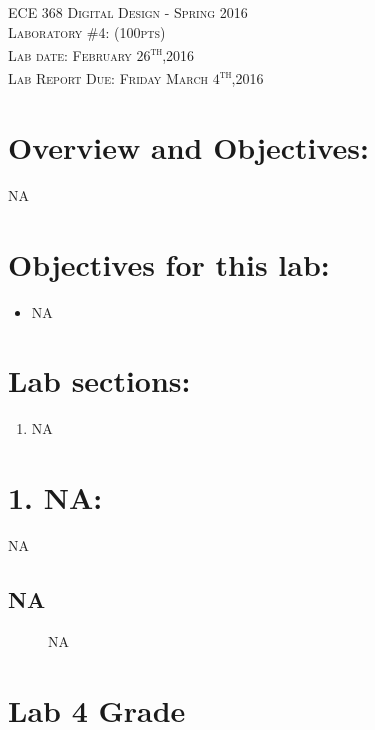 \documentclass{article}
\begin{document}
\begin{center}
\textsc{\huge ECE 368 Digital Design - Spring 2016}\\[1cm]
\textsc{{\LARGE Laboratory \#4: (100pts)}}\\[0.5cm]
\textsc{\Large Lab date: February $26$\textsuperscript{th},2016}\\[0.5cm]
\textsc{\Large Lab Report Due: Friday March $4$\textsuperscript{th},2016}\\[1cm]
\end{center}

\section{Overview and Objectives:}
NA

\section{Objectives for this lab:}
\begin{itemize}
  \item NA
\end{itemize}

\section{Lab sections:}
\begin{enumerate}
  \item NA
\end{enumerate}

\newpage
\section{1. NA:}
NA

\subsection{NA}

\begin{figure}[!htbp]
  \centering
  \caption{NA}
\end{figure}

\section{Lab 4 Grade}
\end{document}
